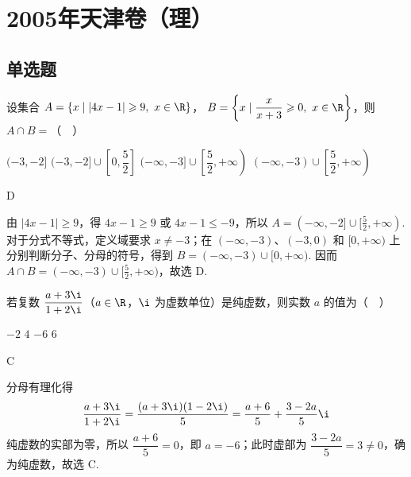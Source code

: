 \chapter{2005年天津卷（理）}

\section{单选题}

\begin{problem}
设集合 \(A=\{x\mid |4x-1|\geqslant9,\ x\in\R\}\)，
\(B=\left\{x\mid \dfrac{x}{x+3}\geqslant0,\ x\in\R\right\}\)，则
\(A\cap B=\)（\(\quad\)）

\choices
    {\((-3,-2]\)}
    {\((-3,-2]\cup\left[0,\dfrac52\right]\)}
    {\((-\infty,-3]\cup\left[\dfrac52,+\infty\right)\)}
    {\((-\infty,-3)\cup\left[\dfrac52,+\infty\right)\)}
\end{problem}

\begin{answer}
D
\end{answer}

\begin{solution}
由 \(|4x-1|\geqslant9\)，得 \(4x-1\geqslant9\) 或 \(4x-1\leqslant-9\)，所以
\(A=(-\infty,-2]\cup[\frac52,+\infty)\). 对于分式不等式，定义域要求 \(x\ne-3\)；在
\((-\infty,-3)\)、\((-3,0)\) 和 \([0,+\infty)\) 上分别判断分子、分母的符号，得到
\(B=(-\infty,-3)\cup[0,+\infty)\). 因而
\(A\cap B=(-\infty,-3)\cup[\frac52,+\infty)\)，故选 D.
\end{solution}

\begin{problem}
若复数 \(\dfrac{a+3\i}{1+2\i}\)（\(a\in\R\)，\(\i\) 为虚数单位）是纯虚数，则实数 \(a\) 的值为（\(\quad\)）

\choices
    {\(-2\)}
    {\(4\)}
    {\(-6\)}
    {\(6\)}
\end{problem}

\begin{answer}
C
\end{answer}

\begin{solution}
分母有理化得
\[
\frac{a+3\i}{1+2\i}
=\frac{(a+3\i)(1-2\i)}5
=\frac{a+6}{5}+\frac{3-2a}{5}\i
\]
纯虚数的实部为零，所以 \(\dfrac{a+6}{5}=0\)，即 \(a=-6\)；此时虚部为
\(\dfrac{3-2a}{5}=3\ne0\)，确为纯虚数，故选 C.
\end{solution}

